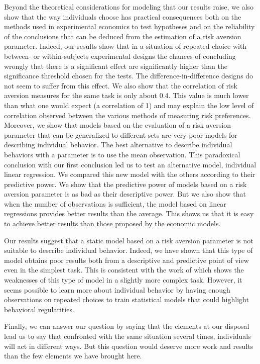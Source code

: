 \documentclass[
]{book}
\begin{document}
Beyond the theoretical considerations for modeling that our results
raise, we also show that the way individuals choose has practical
consequences both on the methods used in experimental economics to test
hypotheses and on the reliability of the conclusions that can be deduced
from the estimation of a risk aversion parameter. Indeed, our results
show that in a situation of repeated choice with between- or within-subjects
experimental designs the chances of concluding wrongly that there is a
significant effect are significantly higher than the significance threshold chosen for the tests.
The difference-in-difference designs do not seem to suffer from this
effect. We also show that the correlation of risk aversion measures for
the same task is only about
0.4.
This value is much lower than what one would expect (a correlation of 1)
and may explain the low level of correlation observed between the
various methods of measuring risk preferences. Moreover, we show that
models based on the evaluation of a risk aversion parameter that can be
generalized to different sets are very poor models for describing
individual behavior. The best alternative to describe individual
behaviors with a parameter is to use the mean observation. This
paradoxical conclusion with our first conclusion led us to test an
alternative model, individual linear regression. We compared this new
model with the others according to their predictive power. We show that
the predictive power of models based on a risk aversion parameter is as
bad as their descriptive power. But we also show that when the number of
observations is sufficient, the model based on linear regressions
provides better results than the average. This shows us that it is easy to
achieve better results than those proposed by the economic models.

Our results suggest that a static model based on a risk aversion
parameter is not suitable to describe individual behavior. Indeed, we
have shown that this type of model obtains poor results both from a
descriptive and predictive point of view even in the simplest task. This
is consistent with the work of \citet{wilcox2007predicting} which shows the
weaknesses of this type of model in a slightly more complex task.
However, it seems possible to learn more about individual behavior by
having enough observations on repeated choices to train statistical
models that could highlight behavioral regularities.

Finally, we can answer our question by saying that the elements at our
disposal lead us to say that confronted with the same situation several
times, individuals will act in different ways. But this question would
deserve more work and results than the few elements we have brought
here.
\end{document}
